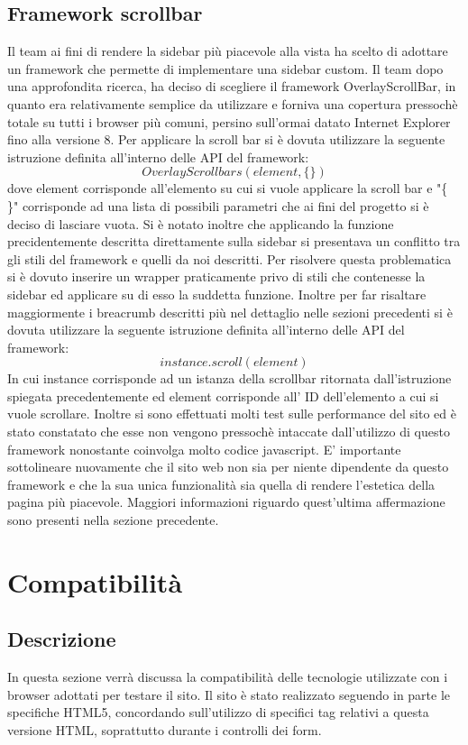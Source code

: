 \documentclass[12pt]{article}
\begin{document}
	\subsection{Framework scrollbar}
	Il team ai fini di rendere la sidebar più piacevole alla vista ha scelto di adottare un framework che permette di implementare una sidebar custom. Il team dopo una approfondita ricerca, ha deciso di scegliere il framework OverlayScrollBar, in quanto era relativamente semplice da utilizzare e forniva una copertura pressochè totale su tutti i browser più comuni, persino sull'ormai datato Internet Explorer fino alla versione 8.
	Per applicare la scroll bar si è dovuta utilizzare la seguente istruzione definita all'interno delle API del framework:
	\[ OverlayScrollbars(element, \{ \}) \]
	dove element corrisponde all'elemento su cui si vuole applicare la scroll bar e "\{ \}" corrisponde ad una lista di possibili parametri che ai fini del progetto si è deciso di lasciare vuota.
	Si è notato inoltre che applicando la funzione precidentemente descritta direttamente sulla sidebar si presentava un conflitto tra gli stili del framework e quelli da noi descritti. Per risolvere questa problematica si è dovuto inserire un wrapper praticamente privo di stili che contenesse la sidebar ed applicare su di esso la suddetta funzione.
	Inoltre per far risaltare maggiormente i breacrumb descritti più nel dettaglio nelle sezioni precedenti si è dovuta utilizzare la seguente istruzione definita all'interno delle API del framework:
	\[ instance.scroll(element) \]
	In cui instance corrisponde ad un istanza della scrollbar ritornata dall'istruzione spiegata precedentemente ed element corrisponde all' ID dell'elemento a cui si vuole scrollare.
	Inoltre si sono effettuati molti test sulle performance del sito ed è stato constatato che esse non vengono pressochè intaccate dall'utilizzo di questo framework nonostante coinvolga molto codice javascript.
	E' importante sottolineare nuovamente che il sito web non sia per niente dipendente da questo framework e che la sua unica funzionalità sia quella di rendere l'estetica della pagina più piacevole. Maggiori informazioni riguardo quest'ultima affermazione sono presenti nella sezione precedente.
	\section{Compatibilità}
	\subsection{Descrizione}
	In questa sezione verrà discussa la compatibilità delle tecnologie utilizzate con i browser adottati per testare il sito. Il sito è stato realizzato seguendo in parte le specifiche HTML5, concordando sull'utilizzo  di specifici tag relativi a questa versione HTML, soprattutto durante i controlli dei form.
\end{document}
